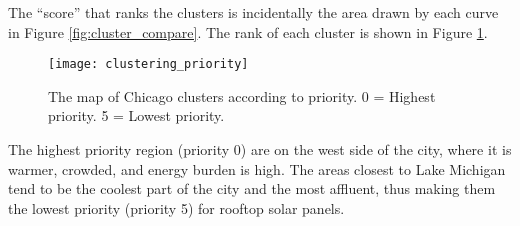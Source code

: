The ``score'' that ranks the clusters is incidentally the area drawn by each
curve in Figure \ref{fig:cluster_compare}. The rank of each cluster is shown in
Figure \ref{fig:cluster_priority}.

\begin{figure}[H]
    \begin{center}
      \texttt{[image: clustering\_priority]}
      \caption{The map of Chicago clusters according to priority.
      0 = Highest priority. 5 = Lowest priority.}
      \label{fig:cluster_priority}
    \end{center}
\end{figure}

The highest priority region (priority 0) are on the west side of the city, where
it is warmer, crowded, and energy burden is high. The areas closest to Lake Michigan
tend to be the coolest part of the city and the most affluent, thus making them
the lowest priority (priority 5) for rooftop solar panels.

